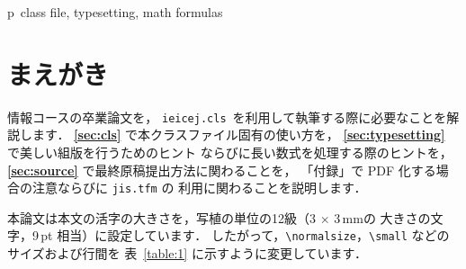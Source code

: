 \documentclass[paper]{ieicej}%
\def\ANCTJcls{\texttt{ieicej.cls}}
\def\ANCTJver{1.0}
\begin{document}
\makeatletter
\if@letter
  \makeatother
  \maketitle
\fi
\begin{abstract}
  Course of Information Engineering
  provides a p\LaTeXe\ class file, named \ANCTJcls\ (ver.\,\ANCTJver),
  for the Graduation Thesis. This document describes how to use
  the class file, and also makes some remarks about typesetting
  a manuscript by using the p\LaTeXe.
  The design is based on ASCII Japanese p\LaTeXe.
\end{abstract}
\begin{keyword}
  p\LaTeXe\ class file, typesetting, math formulas
\end{keyword}
\makeatletter
\if@letter
  \makeatother
\else
  \maketitle
\fi

\section{まえがき}

情報コースの卒業論文を，
\ANCTJcls\ を利用して執筆する際に必要なことを解説します．
{\bfseries \ref{sec:cls}} で本クラスファイル固有の使い方を，
{\bfseries \ref{sec:typesetting}} で美しい組版を行うためのヒント
ならびに長い数式を処理する際のヒントを，
{\bfseries \ref{sec:source}} で最終原稿提出方法に関わることを，
「付録」で PDF 化する場合の注意ならびに \texttt{jis.tfm} の
利用に関わることを説明します．

本論文は本文の活字の大きさを，写植の単位の12級（3 $\times$ 3\,mmの
大きさの文字，9\,pt 相当）に設定しています．
したがって，\verb/\normalsize/，\verb/\small/ などのサイズおよび行間を
表~\ref{table:1} に示すように変更しています．
\end{document}
